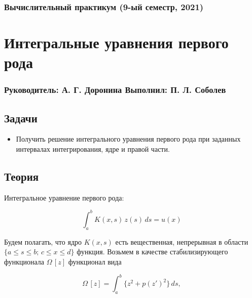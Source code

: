 




\subsubsection*{Вычислительный практикум (9-ый семестр, 2021)}
\section*{Интегральные уравнения первого рода}
\subsubsection*{Руководитель: А. Г. Доронина \hspace{2em} Выполнил: П. Л. Соболев}

\vspace{3em}

\subsection*{Задачи}

\begin{itemize}
  \setlength\itemsep{-0.1em}
  \item Получить решение интегрального уравнения первого рода при заданных интервалах интегрирования, ядре и правой части.
\end{itemize}

\subsection*{Теория}

Интегральное уравнение первого рода:

\begin{equation}
  \int_a^b K(x, s) \, z(s) \, ds = u(x)
\end{equation}

Будем полагать, что ядро $ K(x, s) $ есть вещественная, непрерывная в области $ \{ a \leqslant s \leqslant b; \, c \leqslant x \leqslant d \} $ функция. Возьмем в качестве стабилизирующего функционала $ \Omega \, [z] $ функционал вида

\begin{equation}
  \Omega \, [z] = \int_a^b \{ z^2 + p(z')^2 \} \, ds,
\end{equation}

